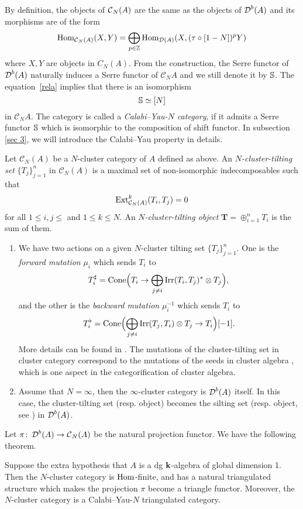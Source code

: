 By definition, the objects of $\operatorname{\mathcal{C}}_N(A)$ are the same as the objects of $\operatorname{\mathcal{D}}^b(A)$
and its morphisms are of the form
\[
  \operatorname{Hom}_{\operatorname{\mathcal{C}}_N(A)}(X, Y)
  = \bigoplus_{p \in \mathbb{Z}} \operatorname{Hom}_{\operatorname{\mathcal{D}}(A)}(X, (\tau \circ [1-N])^pY)
\]
where $X, Y$ are objects in $C_N(A)$.
From the construction, the Serre functor of $\operatorname{\mathcal{D}}^b(A)$
naturally induces a Serre functor of $\mathcal{C}_NA$
and we still denote it by $\mathbb{S}$.
The equation~\eqref{rela} implies that there is an isomorphism
\[ \mathbb{S} \simeq [N] \]
in $\mathcal{C}_NA$.
The category is called a \textit{Calabi--Yau-$N$ category},
if it admits a Serre functor $\mathbb{S}$
which is isomorphic to the composition of shift functor.
In subsection \ref{sec 3}, we will introduce the Calabi--Yau property in details.
\begin{definition}
  Let $\mathcal{C}_N(A)$ be a $N$-cluster category of $A$ defined as above.
  An \textit{$N$-cluster-tilting set} $\{T_j\}_{j=1}^n$ in $\mathcal{C}_N(A)$
  is a maximal set of non-isomorphic indecomposables such that
  \[ \operatorname{Ext}^k_{\mathcal{C}_N(A)}(T_i, T_j) = 0 \]
  for all $1 \leq i, j \leq$ and $1 \leq k \leq N$.
  An \textit{$N$-cluster-tilting object} $\textbf{T} = \oplus_{i=1}^n T_i$
  is the sum of them.
\end{definition}
\begin{remark} \hfill
  \begin{enumerate}
    \item We have two actions on a given $N$-cluster tilting set $\{T_j\}_{j=1}^n$.
      One is the \textit{forward mutation} $\mu_i$ which sends $T_i$ to
      \[
        T_i^\sharp
        = \operatorname{Cone}\Bigl(T_i \to \bigoplus_{j\neq i} \operatorname{Irr}(T_i,T_j)^* \otimes T_j\Bigr),
      \]
      and the other is the \textit{backward mutation} $\mu_i^{-1}$ which sends $T_i$ to
      \[
        T_i^\flat
        = \operatorname{Cone}\Bigl(\bigoplus_{j\neq i} \operatorname{Irr}(T_j,T_i) \otimes T_j \to T_i\Bigr)[-1].
      \]
      More details can be found in \cite[definition 4.1]{KQ}.
      The mutations of the cluster-tilting set in cluster category
      correspond to the mutations of the seeds in cluster algebra \cite{K5},
      which is one aspect in the categorification of cluster algebra.
    \item Assume that $N = \infty$,
      then the $\infty$-cluster category is $\operatorname{\mathcal{D}}^b(A)$ itself.
      In this case, the cluster-tilting set (resp. object)
      becomes the silting set (resp. object, see \cite{IY2}) in $\operatorname{\mathcal{D}}^b(A)$.
  \end{enumerate}
\end{remark}

Let $\pi \colon \operatorname{\mathcal{D}}^b(A) \to \operatorname{\mathcal{C}}_N(A)$ be the natural projection functor.
We have the following theorem.
\begin{theorem}\cite[Theorem 3.2]{K1}
  Suppose the extra hypothesis that $A$ is a dg $\mathbf{k}$-algebra of global dimension 1.
  Then the $N$-cluster category is $\operatorname{Hom}$-finite,
  and has a natural triangulated structure
  which makes the projection $\pi$ become a triangle functor.
  Moreover, the $N$-cluster category is a Calabi--Yau-$N$ triangulated category.
\end{theorem}
